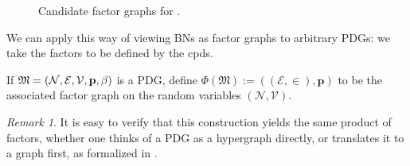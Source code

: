 \documentclass{article}
\theoremstyle{plain}
\theoremstyle{definition}
\theoremstyle{remark}
\newtheorem*{remark}{Remark}
\newcommand\mat[1]{\mathbf{#1}}
\newcommand{\V}{\mathcal V}
\newcommand{\N}{\mathcal N}
\newcommand{\Ed}{\mathcal E}
\newcommand{\dg}[1]{\mathfrak{#1}}
\numberwithin{equation}{section}
\begin{document}
{\begin{figure}[htb]
\begin{subfigure}[b]{0.3\linewidth}
{}
			\caption{}\label{subfig:fg-smoking}
		\end{subfigure}%
		\caption{Candidate factor graphs for .
		}
		\label{fig:fg-intro-examples}
	\end{figure}

	We can apply this way of viewing BNs as factor graphs to arbitrary
	PDGs: we take the factors to be defined by the cpds.
	\begin{defn}
		If $\dg M = \mnvars[]$ is a PDG, define 
		$ \Phi(\dg M) := ((\Ed,\in), \mat p)$
		to be the associated factor graph on the random
				variables $(\N, \V)$. 
	\end{defn}
	\begin{remark}
		It is easy to verify that this construction yields the 
				same product of factors, whether one thinks of a PDG
				as a hypergraph directly, or translates it to a graph
				first, as formalized in . 
	\end{remark}

}
\end{document}
